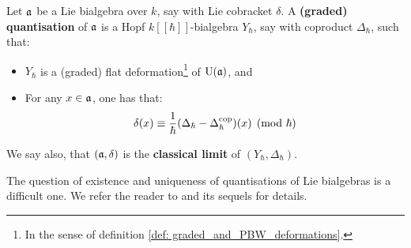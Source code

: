         \begin{definition}[Quantisations] \label{def: quantisations}
            Let $\mathfrak{a}$ be a Lie bialgebra over $k$, say with Lie cobracket $\delta$. A \textbf{(graded) quantisation} of $\mathfrak{a}$ is a Hopf $k[\![\hbar]\!]$-bialgebra $Y_{\hbar}$, say with coproduct $\Delta_{\hbar}$, such that:
            \begin{itemize}
                \item $Y_{\hbar}$ is a (graded) flat deformation\footnote{In the sense of definition \ref{def: graded_and_PBW_deformations}.} of $\mathrm{U}(\mathfrak{a})$, and
                \item For any $x \in \mathfrak{a}$, one has that:
                    $$\delta(x) \equiv \frac{1}{\hbar}(\Delta_{\hbar} - \Delta_{\hbar}^{\mathrm{cop}})(x) \pmod{\hbar}$$
            \end{itemize}
            We say also, that $(\mathfrak{a}, \delta)$ is the \textbf{classical limit} of $(Y_{\hbar}, \Delta_{\hbar})$. 
        \end{definition}
        \begin{remark}
            The question of existence and uniqueness of quantisations of Lie bialgebras is a difficult one. We refer the reader to \cite{etingof_kazhdan_quantisation_1} and its sequels for details.
        \end{remark}

